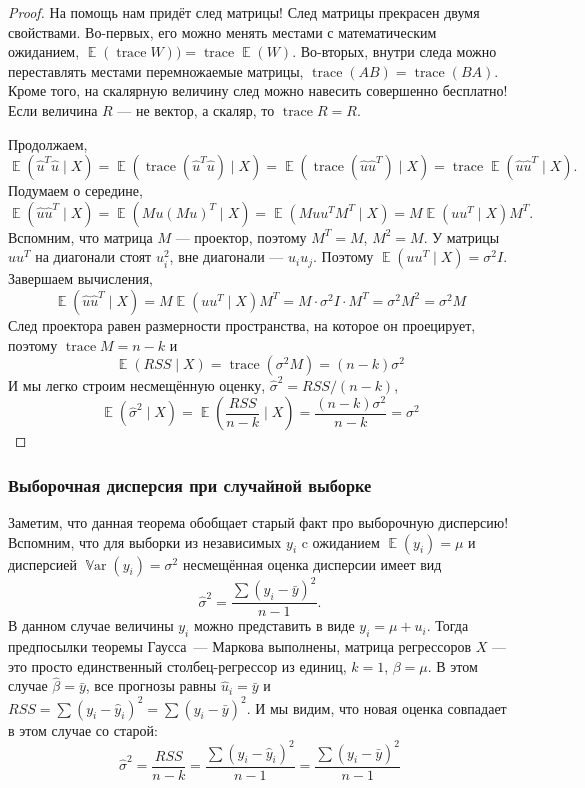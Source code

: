 \documentclass[12pt]{article}
\DeclareMathOperator{\Var}{\mathbb{V}ar}
\DeclareMathOperator{\E}{\mathbb{E}}
\DeclareMathOperator{\trace}{trace}
\newcommand{\hb}{\hat{\beta}}
\newcommand{\hu}{\hat{u}}
\newcommand{\hs}{\hat{\sigma}}
\newcommand{\hy}{\hat{y}}
\newcommand{\RSS}{RSS}
\begin{document}
\begin{proof}
На помощь нам придёт след матрицы! 
След матрицы прекрасен двумя свойствами. 
Во-первых, его можно менять местами с математическим ожиданием, $\E(\trace W)) = \trace \E(W)$. 
Во-вторых, внутри следа можно переставлять местами перемножаемые матрицы, $\trace (AB) = \trace (BA)$. 
Кроме того, на скалярную величину след можно навесить совершенно бесплатно!
Если величина $R$ — не вектор, а скаляр, то $\trace R = R$.

Продолжаем,
\[
\E(\hu^T \hu \mid X) = \E(\trace (\hu^T \hu) \mid X) = \E( \trace(\hu \hu^T)\mid X) = \trace \E(\hu \hu^T \mid X).
\]
Подумаем о середине,
\[
\E(\hu \hu^T \mid X) = \E(Mu (Mu)^T \mid X) = \E(Mu u^T M^T \mid X) = M \E(uu^T \mid X) M^T.
\]
Вспомним, что матрица $M$ — проектор, поэтому $M^T = M$, $M^2 = M$.
У матрицы $uu^T$ на диагонали стоят $u_i^2$, вне диагонали — $u_iu_j$.
Поэтому $\E(uu^T\mid X) = \sigma^2 I$.
Завершаем вычисления,
\[
\E(\hu \hu^T \mid X) =  M \E(uu^T \mid X) M^T= M \cdot \sigma^2 I \cdot M^T = \sigma^2 M^2 = \sigma^2 M
\]
След проектора равен размерности пространства, на которое он проецирует, поэтому $\trace M = n - k$ и
\[
\E(RSS \mid X) = \trace(\sigma^2 M) = (n - k) \sigma^2
\]
И мы легко строим несмещённую оценку, $\hs^2 = \RSS / (n - k)$,
\[
\E( \hs^2 \mid X) = \E \left( \frac{\RSS}{n - k} \mid X \right) = \frac{(n - k) \sigma^2}{ n - k} = \sigma^2
\]

\end{proof}

\subsubsection*{Выборочная дисперсия при случайной выборке}

Заметим, что данная теорема обобщает старый факт про выборочную дисперсию!
Вспомним, что для выборки из независимых $y_i$ c ожиданием $\E(y_i) = \mu$ и дисперсией $\Var(y_i) = \sigma^2$ несмещённая оценка дисперсии имеет вид 
\[
\hat\sigma^2 = \frac{\sum(y_i - \bar y)^2}{n - 1}.
\]
В данном случае величины $y_i$ можно представить в виде $y_i = \mu + u_i$.
Тогда предпосылки теоремы Гаусса~— Маркова выполнены, матрица регрессоров $X$  — это просто единственный столбец-регрессор из единиц, $k = 1$, $\beta = \mu$. 
В этом случае $\hb = \bar y$, все прогнозы равны $\hu_i = \bar y$ и $\RSS = \sum (y_i - \hy_i)^2 = \sum (y_i - \bar y)^2$.
И мы видим, что новая оценка совпадает в этом случае со старой:
\[
\hat\sigma^2 = \frac{\RSS}{n- k} = \frac{\sum (y_i - \hy_i)^2}{ n - 1} = \frac{\sum (y_i - \bar y)^2}{n - 1}
\]
\end{document}
